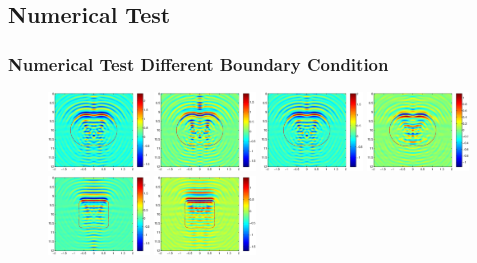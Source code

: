 \documentclass[cjk,8pt]{beamer}
\begin{document}
\begin{CJK*}{GBK}{kai}
\section{Numerical Test}
\begin{frame}
\frametitle{Numerical Test Different Boundary Condition}
 \begin{figure}
 	\centering
 	\includegraphics[width=0.24\textwidth]{./graphic/peanut_3pi.eps}
 	\includegraphics[width=0.24\textwidth]{./graphic/peanut_3pi_neumann.eps}
 	\includegraphics[width=0.24\textwidth]{./graphic/peanut_3pi_impedance_1.eps}
 	\includegraphics[width=0.24\textwidth]{./graphic/peanut_3pi_transmission.eps}\\
    \includegraphics[width=0.24\textwidth]{./graphic/rectangle_3pi.eps}
 	\includegraphics[width=0.24\textwidth]{./graphic/rectangle_3pi_neumann.eps}

\end{figure}
\end{frame}
\end{CJK*}
\end{document}
